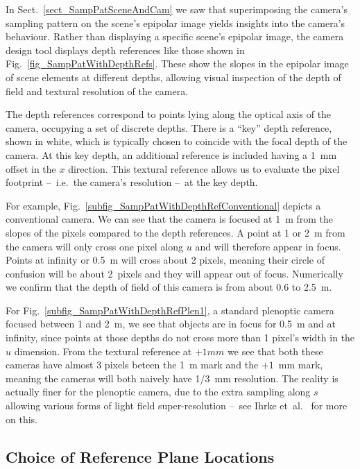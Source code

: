 \documentclass[onecolumn]{article}
\begin{document}
In Sect.~\ref{sect_SampPatSceneAndCam} we saw that superimposing the camera's sampling pattern on the scene's epipolar image yields insights into the camera's behaviour.  Rather than displaying a specific scene's epipolar image, the camera design tool displays depth references like those shown in Fig.~\ref{fig_SampPatWithDepthRefs}.  These show the slopes in the epipolar image of scene elements at different depths, allowing visual inspection of the depth of field and textural resolution of the camera.  

The depth references correspond to points lying along the optical axis of the camera, occupying a set of discrete depths.  There is a ``key'' depth reference, shown in white, which is typically chosen to coincide with the focal depth of the camera.  At this key depth, an additional reference is included having a 1~mm offset in the $x$ direction.  This textural reference allows us to evaluate the pixel footprint --~i.e.~the camera's resolution --~at the key depth.  

For example, Fig.~\ref{subfig_SampPatWithDepthRefConventional} depicts a conventional camera.  We can see that the camera is focused at 1~m from the slopes of the pixels compared to the depth references.  A point at 1 or 2~m from the camera will only cross one pixel along $u$ and will therefore appear in focus.  Points at infinity or 0.5~m will cross about 2 pixels, meaning their circle of confusion will be about 2~pixels and they will appear out of focus.  Numerically we confirm that the depth of field of this camera is from about 0.6 to 2.5~m.

For Fig.~\ref{subfig_SampPatWithDepthRefPlen1}, a standard plenoptic camera focused between 1 and 2~m, we see that objects are in focus for 0.5~m and at infinity, since points at those depths do not cross more than 1 pixel's width in the $u$ dimension. From the textural reference at $+1mm$ we see that both these cameras have almost 3 pixels beteen the 1~m mark and the $+1$~mm mark, meaning the cameras will both naively have 1/3~mm resolution.  The reality is actually finer for the plenoptic camera, due to the extra sampling along $s$ allowing various forms of light field super-resolution --~see Ihrke et~al.~\cite{ihrke2016principles} for more on this.

\subsection{Choice of Reference Plane Locations}
\label{sect_RefPlaneLocations}
\end{document}
